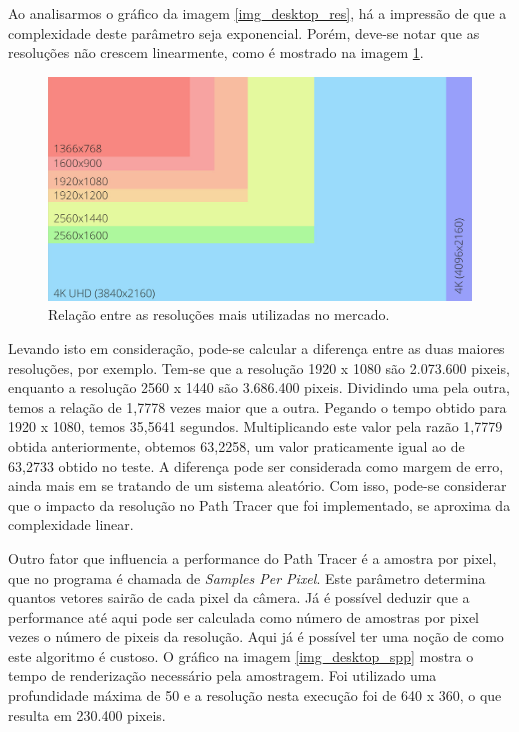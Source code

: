 \documentclass[journal]{IEEEtran}
\begin{document}
Ao analisarmos o gráfico da imagem \ref{img_desktop_res}, há a impressão de que a complexidade deste parâmetro seja exponencial.
Porém, deve-se notar que as resoluções não crescem linearmente, como é mostrado na imagem \ref{img_resolutions}.

\begin{figure}[ht]
  \centering
  \includegraphics[width=\linewidth]{media/resolutions.png}
  \caption{Relação entre as resoluções mais utilizadas no mercado.}
  \label{img_resolutions}
\end{figure}

Levando isto em consideração, pode-se calcular a diferença entre as duas maiores resoluções, por exemplo.
Tem-se que a resolução 1920 x 1080 são 2.073.600 pixeis, enquanto a resolução 2560 x 1440 são 3.686.400
pixeis. Dividindo uma pela outra, temos a relação de 1,7778 vezes maior que a outra. Pegando o tempo
obtido para 1920 x 1080, temos 35,5641 segundos. Multiplicando este valor pela razão 1,7779 obtida 
anteriormente, obtemos 63,2258, um valor praticamente igual ao de 63,2733 obtido no teste. A diferença pode
ser considerada como margem de erro, ainda mais em se tratando de um sistema aleatório. Com isso, pode-se
considerar que o impacto da resolução no Path Tracer que foi implementado, se aproxima da complexidade
linear.

Outro fator que influencia a performance do Path Tracer é a amostra por pixel, que no programa é chamada
de \emph{Samples Per Pixel}. Este parâmetro determina quantos vetores sairão de cada pixel da câmera. Já é
possível deduzir que a performance até aqui pode ser calculada como número de amostras por pixel vezes o
número de pixeis da resolução. Aqui já é possível ter uma noção de como este algoritmo é custoso. O gráfico na imagem 
\ref{img_desktop_spp} mostra o tempo de renderização necessário pela amostragem. Foi utilizado uma profundidade
máxima de 50 e a resolução nesta execução foi de 640 x 360, o que resulta em 230.400 pixeis.
\end{document}
